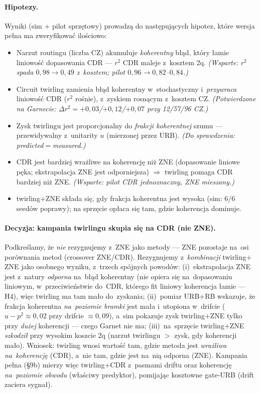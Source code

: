 \documentclass[11pt,a4paper]{article}
\begin{document}
\paragraph{Hipotezy.} Wyniki (sim + pilot sprzętowy) prowadzą do następujących hipotez, które
wersja pełna ma zweryfikować ilościowo:
\begin{itemize}
\item[\textbf{H1}] Narzut routingu (liczba CZ) akumuluje \emph{koherentny} błąd, który łamie
  liniowość dopasowania CDR --- $r^2$ CDR maleje z~kosztem 2q. \emph{(Wsparte: $r^2$ spada
  $0{,}98\!\to\!0{,}49$ z~kosztem; pilot $0{,}96\!\to\!0{,}82$--$0{,}84$.)}
\item[\textbf{H2}] Circuit twirling zamienia błąd koherentny w~stochastyczny i~\emph{przywraca}
  liniowość CDR ($r^2$ rośnie), z~zyskiem rosnącym z~kosztem CZ. \emph{(Potwierdzone na Garnecie:
  $\Delta r^2 = +0{,}03$/$+0{,}12$/$+0{,}07$ przy 12/57/96 CZ.)}
\item[\textbf{H3}] Zysk twirlingu jest proporcjonalny do \emph{frakcji koherentnej} szumu ---
  przewidywalny z~unitarity $u$ (mierzonej przez URB). \emph{(Do sprawdzenia: predicted$=$measured.)}
\item[\textbf{H4}] CDR jest bardziej wrażliwe na koherencję niż ZNE (dopasowanie liniowe pęka;
  ekstrapolacja ZNE jest odporniejsza) $\Rightarrow$ twirling pomaga CDR bardziej niż ZNE.
  \emph{(Wsparte: pilot CDR jednoznaczny, ZNE mieszany.)}
\item[\textbf{H5}] twirling$+$ZNE składa się, gdy frakcja koherentna jest wysoka (sim: 6/6 seedów
  poprawy); na sprzęcie opłaca się tam, gdzie koherencja dominuje.
\end{itemize}

\paragraph{Decyzja: kampania twirlingu skupia się na CDR (nie ZNE).} Podkreślamy, że
\emph{nie} rezygnujemy z~ZNE jako metody --- ZNE pozostaje na~osi porównania metod
(crossover ZNE/CDR). Rezygnujemy z~\emph{kombinacji} twirling$+$ZNE jako osobnego wyniku,
z~trzech spójnych powodów: (i)~ekstrapolacja ZNE jest z~natury \emph{odporna} na~błąd
koherentny (nie opiera się na~dopasowaniu liniowym, w~przeciwieństwie do~CDR, którego fit
liniowy koherencja łamie --- H4), więc twirling ma tam mało do~zyskania; (ii)~pomiar URB$+$RB
wskazuje, że frakcja koherentna \emph{na~poziomie bramki} jest mała i~utopiona w~drifcie
($u-p^2\approx0{,}02$ przy drifcie $\approx0{,}09$), a~sim pokazuje zysk twirling$+$ZNE tylko
przy \emph{dużej} koherencji --- czego Garnet nie ma; (iii)~na~sprzęcie twirling$+$ZNE
\emph{szkodził} przy wysokim koszcie 2q (narzut twirlingu $>$ zysk, gdy koherencji mało).
Wniosek: twirling wnosi wartość tam, gdzie metoda jest \emph{wrażliwa na~koherencję} (CDR), a~nie
tam, gdzie jest na~nią odporna (ZNE). Kampania pełna (§9b) mierzy więc twirling$+$CDR z~pasmami
driftu oraz koherencję \emph{na~poziomie obwodu} (właściwy predyktor), pomijając kosztowne
gate-URB (drift zaciera sygnał).
\end{document}
